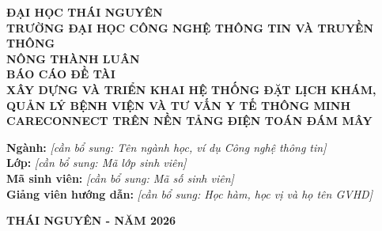 \documentclass[13pt,a4paper,oneside]{extreport}
\numberwithin{equation}{chapter}
\numberwithin{figure}{chapter}
\numberwithin{table}{chapter}
\begin{document}
\begin{titlepage}
    \begin{center}
        \textbf{ĐẠI HỌC THÁI NGUYÊN}\\
        \textbf{TRƯỜNG ĐẠI HỌC CÔNG NGHỆ THÔNG TIN VÀ TRUYỀN THÔNG}\\[2.0cm]

        \textbf{\large \MakeUppercase{Nông Thành Luân}}\\[2.0cm]

        {\fontsize{16}{22}\selectfont \textbf{BÁO CÁO ĐỀ TÀI}}\\[0.5cm]
        {\fontsize{18}{24}\selectfont \textbf{XÂY DỰNG VÀ TRIỂN KHAI HỆ THỐNG ĐẶT LỊCH KHÁM, QUẢN LÝ BỆNH VIỆN VÀ TƯ VẤN Y TẾ THÔNG MINH CARECONNECT TRÊN NỀN TẢNG ĐIỆN TOÁN ĐÁM MÂY}}\\[2.5cm]

        \begin{flushleft}
            \hspace{2.5cm}\textbf{Ngành:} \textit{[cần bổ sung: Tên ngành học, ví dụ Công nghệ thông tin]}\\
            \hspace{2.5cm}\textbf{Lớp:} \textit{[cần bổ sung: Mã lớp sinh viên]}\\
            \hspace{2.5cm}\textbf{Mã sinh viên:} \textit{[cần bổ sung: Mã số sinh viên]}\\
            \hspace{2.5cm}\textbf{Giảng viên hướng dẫn:} \textit{[cần bổ sung: Học hàm, học vị và họ tên GVHD]}
        \end{flushleft}

        \vfill
        \textbf{THÁI NGUYÊN - NĂM 2026}
    \end{center}
\end{titlepage}

\tableofcontents
\clearpage
\listoftables
\clearpage
\listoffigures
\clearpage

\clearpage


\clearpage

\clearpage

\clearpage

\clearpage

\clearpage

\clearpage



\end{document}
